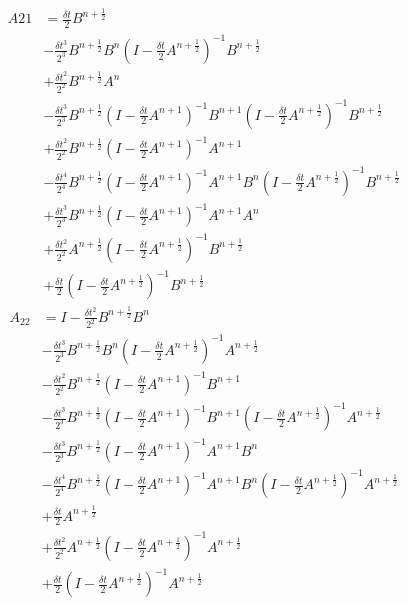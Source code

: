 \documentclass[12pt]{article}
\begin{document}
\begin{align}
 A{21} &= \frac{\delta t}{2}B^{n+\frac 12} \\
   & - \frac{\delta t^3}{2^3}B^{n+\frac 12}B^{n}(I - \frac{\delta t}{2}A^{n+\frac 12})^{-1}B^{n+\frac 12} \\
   & + \frac{\delta t^2}{2^2}B^{n+\frac 12}A^{n} \\
   & - \frac{\delta t^3}{2^3}B^{n+\frac 12}(I - \frac{\delta t}{2}A^{n+1})^{-1}B^{n+1}(I - \frac{\delta t}{2}A^{n+\frac 12})^{-1}B^{n+\frac 12} \\
   & + \frac{\delta t^2}{2^2}B^{n+\frac 12}(I - \frac{\delta t}{2}A^{n+1})^{-1}A^{n+1} \\
   &- \frac{\delta t^4}{2^4}B^{n+\frac 12}(I - \frac{\delta t}{2}A^{n+1})^{-1}A^{n+1}B^{n}(I - \frac{\delta t}{2}A^{n+\frac 12})^{-1}B^{n+\frac 12} \\
   & + \frac{\delta t^3}{2^3}B^{n+\frac 12}(I - \frac{\delta t}{2}A^{n+1})^{-1}A^{n+1}A^{n} \\
    & + \frac{\delta t^2}{2^2}A^{n+\frac 12}(I - \frac{\delta t}{2}A^{n+\frac 12})^{-1}B^{n+\frac 12} \\
    & + \frac{\delta t}{2}(I - \frac{\delta t}{2}A^{n+\frac 12})^{-1}B^{n+\frac 12}
\end{align}
\begin{align}
 A_{22} &= I - \frac{\delta t^2}{2^2}B^{n+\frac 12}B^{n} \\
 & - \frac{\delta t^3}{2^3}B^{n+\frac 12}B^{n}(I - \frac{\delta t}{2}A^{n+\frac 12})^{-1}A^{n+\frac 12}  \\
  & - \frac{\delta t^2}{2^2}B^{n+\frac 12}(I - \frac{\delta t}{2}A^{n+1})^{-1}B^{n+1} \\
  & - \frac{\delta t^3}{2^3}B^{n+\frac 12}(I - \frac{\delta t}{2}A^{n+1})^{-1}B^{n+1}(I - \frac{\delta t}{2}A^{n+\frac 12})^{-1}A^{n+\frac 12} \\
  & - \frac{\delta t^3}{2^3}B^{n+\frac 12}(I - \frac{\delta t}{2}A^{n+1})^{-1}A^{n+1}B^{n} \\
  & - \frac{\delta t^4}{2^4}B^{n+\frac 12}(I - \frac{\delta t}{2}A^{n+1})^{-1}A^{n+1}B^{n}(I - \frac{\delta t}{2}A^{n+\frac 12})^{-1}A^{n+\frac 12}  \\
  & + \frac{\delta t}{2}A^{n+\frac 12} \\
  & + \frac{\delta t^2}{2^2}A^{n+\frac 12}(I - \frac{\delta t}{2}A^{n+\frac 12})^{-1}A^{n+\frac 12} \\
  & + \frac{\delta t}{2}(I - \frac{\delta t}{2}A^{n+\frac 12})^{-1}A^{n+\frac 12}
\end{align}
\end{document}
